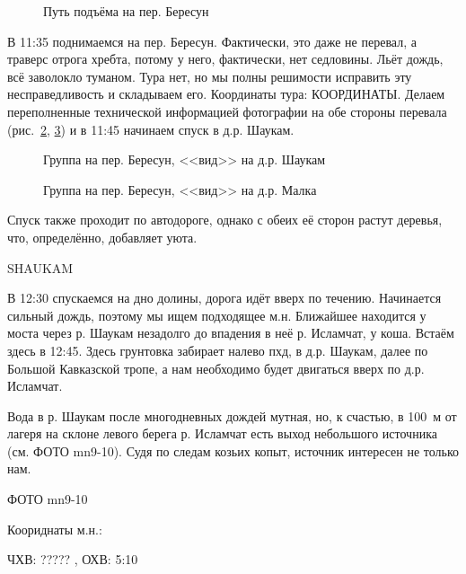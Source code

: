 \begin{figure}[h!]
	\centering
	\caption{Путь подъёма на пер. Бересун}
	\label{fig:beresun1}
\end{figure}


В 11:35 поднимаемся на пер. Бересун. Фактически, это даже не перевал, а траверс отрога хребта, потому у него, фактически, нет седловины. Льёт дождь, всё заволокло туманом. Тура нет, но мы полны решимости исправить эту несправедливость и складываем его. Координаты тура: КООРДИНАТЫ. Делаем переполненные технической информацией фотографии на обе стороны перевала (рис.~\ref{fig:beresun2}, \ref{fig:beresun3}) и в 11:45 начинаем спуск в д.р. Шаукам.


\begin{figure}[h!]
	\centering
	\caption{Группа на пер. Бересун, <<вид>> на д.р. Шаукам}
	\label{fig:beresun2}
\end{figure}

\begin{figure}[h!]
	\centering
	\caption{Группа на пер. Бересун, <<вид>> на д.р. Малка}
	\label{fig:beresun3}
\end{figure}

Спуск также проходит по автодороге, однако с обеих её сторон растут деревья, что, определённо, добавляет уюта. 

SHAUKAM

В 12:30 спускаемся на дно долины, дорога идёт вверх по течению. Начинается сильный дождь, поэтому мы ищем подходящее м.н. Ближайшее находится у моста через р. Шаукам незадолго до впадения в неё р. Исламчат, у коша. Встаём здесь в 12:45. Здесь грунтовка забирает налево пхд, в д.р. Шаукам, далее по Большой Кавказской тропе, а нам необходимо будет двигаться вверх по д.р. Исламчат.

Вода в р. Шаукам после многодневных дождей мутная, но, к счастью, в 100~м от лагеря на склоне левого берега р. Исламчат есть выход небольшого источника (см. ФОТО mn9-10). Судя по следам козьих копыт, источник интересен не только нам.

ФОТО mn9-10

Коориднаты м.н.: 

ЧХВ: ????? , ОХВ: 5:10
\clearpage
